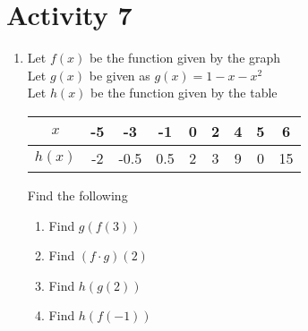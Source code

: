 \documentclass{article}
\begin{document}
\section*{Activity 7}
\noindent
\begin{minipage}[c]{0.60\textwidth}
    \begin{enumerate}
        \vspace{0.5cm}
        \item Let $f(x)$ be the function given by the graph \\
              Let $g(x)$ be given as $g(x)=1-x-x^2$ \\
              Let $h(x)$ be the function given by the table
              \begin{center}
                \raggedright
                \begin{tabular}{|c||c|c|c|c|c|c|c|c|}
                    \hline
                    $x$ & -5 & -3 & -1 & 0 & 2 & 4 & 5 & 6 \\
                    \hline
                    $h(x)$ & -2 & -0.5 & 0.5 & 2 & 3 & 9 & 0 & 15 \\
                    \hline
                \end{tabular}
        \end{center}
              Find the following
              \begin{enumerate}
                \item Find $g(f(3))$
                \vspace{1.2cm}
                \item Find $(f \cdot g)(2)$
                \vspace{1.2cm}
                \item Find $h(g(2))$
                \vspace{1.2cm}
                \item Find $h(f(-1))$
                \vspace{1.2cm}
                
              \end{enumerate}
        \end{enumerate}
\end{minipage}%
\hfill
\end{document}

